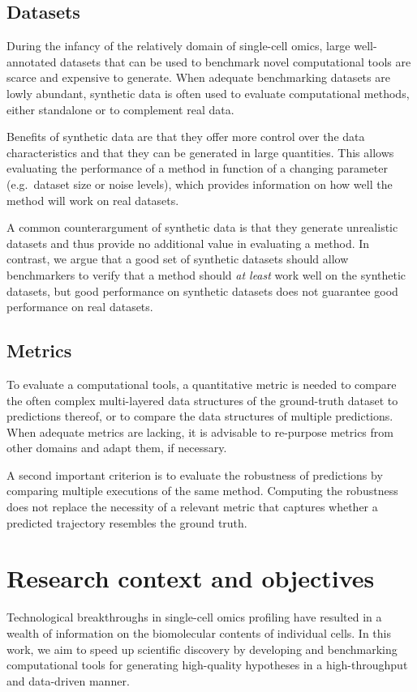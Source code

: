 \subsection{Datasets} 
During the infancy of the relatively domain of single-cell omics, large well-annotated datasets that can be used to benchmark novel computational tools are scarce and expensive to generate.  When adequate benchmarking datasets are lowly abundant, synthetic data is often used to evaluate computational methods, either standalone or to complement real data. 

Benefits of synthetic data are that they offer more control over the data characteristics and that they can be generated in large quantities. This allows evaluating the performance of a method in function of a changing parameter (e.g.~dataset size or noise levels), which provides information on how well the method will work on real datasets.

A common counterargument of synthetic data is that they generate unrealistic datasets and thus provide no additional value in evaluating a method. In contrast, we argue that a good set of synthetic datasets should allow benchmarkers to verify that a method should \textit{at least} work well on the synthetic datasets, but good performance on synthetic datasets does not guarantee good performance on real datasets.

\subsection{Metrics}
To evaluate a computational tools, a quantitative metric is needed to compare  the often complex multi-layered data structures of the ground-truth dataset to predictions thereof, or to compare the data structures of multiple predictions. When adequate metrics are lacking, it is advisable to re-purpose metrics from other domains and adapt them, if necessary.

A second important criterion is to evaluate the robustness of predictions by comparing multiple executions of the same method. Computing the robustness does not replace the necessity of a relevant metric that captures whether a predicted trajectory resembles the ground truth.

\section{Research context and objectives} \label{sec:research_objectives}
Technological breakthroughs in single-cell omics profiling have resulted in a wealth of information on the biomolecular contents of individual cells. In this work, we aim to speed up scientific discovery by developing and benchmarking computational tools for generating high-quality hypotheses in a high-throughput and data-driven manner.

